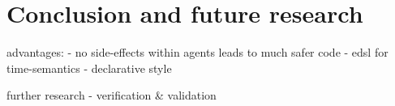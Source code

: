 \section{Conclusion and future research}





advantages: 
	- no side-effects within agents leads to much safer code
	- edsl for time-semantics
	- declarative style
	
further research
	- verification \& validation